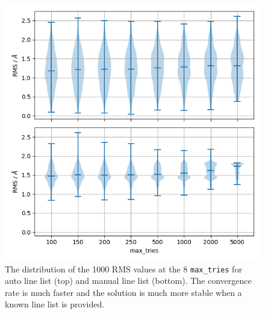 \documentclass{aa}
\begin{document}
\begin{figure}[h]
    \centering
    \includegraphics[width=\columnwidth]{plots/figure_2_rms.png}
    \caption{The distribution of the 1000 RMS values at the 8 \texttt{max\_tries} for auto line list (top) and manual line list (bottom). The convergence rate is much faster and the solution is much more stable when a known line list is provided.}
    \label{fig:rms}
\end{figure}
\end{document}
